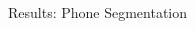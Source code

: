 \documentclass[final]{beamer}
\newlength{\columnheight}
\begin{document}
\begin{frame}[t]
\begin{columns}[T]
\begin{column}{.33\linewidth}
\begin{minipage}[T]{.97\textwidth}
{                }\end{minipage}
        \end{column}



        \begin{column}{.33\linewidth}
            \centering
            \begin{minipage}[T]{.97\textwidth}\parbox[t][\columnheight]{\textwidth}{

                    \begin{block}{Results: Phone Segmentation}

                            \vspace{-0.5ex}


\end{block}}
\end{minipage}
\end{column}
\end{columns}
\end{frame}
\end{document}
